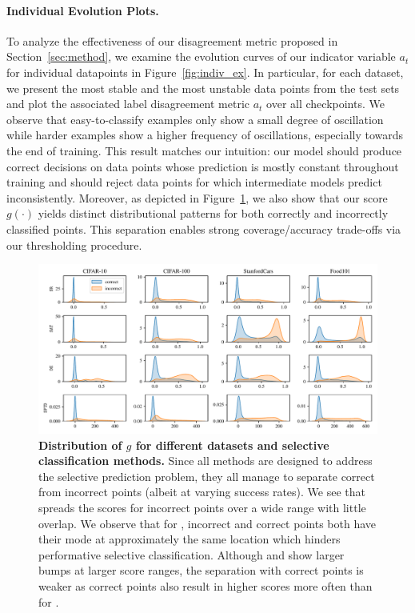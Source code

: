 \paragraph{Individual Evolution Plots.} To analyze the effectiveness of our disagreement metric proposed in Section~\ref{sec:method}, we examine the evolution curves of our indicator variable $a_t$ for individual datapoints in Figure~\ref{fig:indiv_ex}. In particular, for each dataset, we present the most stable and the most unstable data points from the test sets and plot the associated label disagreement metric $a_t$ over all checkpoints. We observe that easy-to-classify examples only show a small degree of oscillation while harder examples show a higher frequency of oscillations, especially towards the end of training. This result matches our intuition: our model should produce correct decisions on data points whose prediction is mostly constant throughout training and should reject data points for which intermediate models predict inconsistently. Moreover, as depicted in Figure~\ref{fig:scores}, we also show that our score $g(\cdot)$ yields distinct distributional patterns for both correctly and incorrectly classified points. This separation enables strong coverage/accuracy trade-offs via our thresholding procedure.

\begin{figure}[t]
  \centering
  \includegraphics[width=\linewidth]{figs/sptd/g_dists.pdf}
\caption[Distribution of $g$ for different datasets and selective classification methods.]{\textbf{Distribution of $g$ for different datasets and selective classification methods.}  Since all methods are designed to address the selective prediction problem, they all manage to separate correct from incorrect points (albeit at varying success rates). We see that \sptd spreads the scores for incorrect points over a wide range with little overlap. We observe that for \sr, incorrect and correct points both have their mode at approximately the same location which hinders performative selective classification. Although \sat and \de show larger bumps at larger score ranges, the separation with correct points is weaker as correct points also result in higher scores more often than for \sptd. }
\label{fig:scores}
\end{figure}

